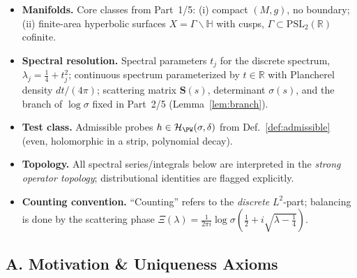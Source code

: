 \begin{tcolorbox}[colback=gray!5,colframe=gray!35,
  title=Scope \& Assumptions (ZNB-9+++ • MEA-Core-SS • enforced)]
\begin{itemize}
  \item \textbf{Manifolds.} Core classes from Part~1/5: (i) compact $(M,g)$, no boundary; (ii) finite-area hyperbolic surfaces $X=\Gamma\backslash\mathbb H$ with cusps, $\Gamma\subset\mathrm{PSL}_2(\mathbb R)$ cofinite.
  \item \textbf{Spectral resolution.} Spectral parameters $t_j$ for the discrete spectrum, $\lambda_j=\tfrac14+t_j^2$; continuous spectrum parameterized by $t\in\mathbb R$ with Plancherel density $dt/(4\pi)$; scattering matrix $\mathbf S(s)$, determinant $\sigma(s)$, and the branch of $\log\sigma$ fixed in Part~2/5 (Lemma~\ref{lem:branch}).
  \item \textbf{Test class.} Admissible probes $h\in \mathcal H_{\PW}(\sigma,\delta)$ from Def.~\ref{def:admissible} (even, holomorphic in a strip, polynomial decay).
  \item \textbf{Topology.} All spectral series/integrals below are interpreted in the \emph{strong operator topology}; distributional identities are flagged explicitly.
  \item \textbf{Counting convention.} ``Counting'' refers to the \emph{discrete} $L^2$-part; balancing is done by the scattering phase $\Xi(\lambda)=\frac{1}{2\pi i}\log\sigma(\frac12+i\sqrt{\lambda-\frac14})$.
\end{itemize}
\end{tcolorbox}

\subsection*{A. Motivation \& Uniqueness Axioms}
\label{subsec:axioms}

